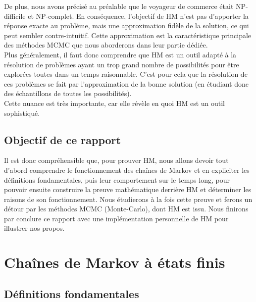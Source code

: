 \documentclass{article}
\begin{document}
De plus, nous avons précisé au préalable que le voyageur de commerce était NP-difficile et NP-complet. En conséquence, l'objectif de HM n'est pas d'apporter la réponse exacte au problème, mais une approximation fidèle de la solution, ce qui peut sembler contre-intuitif. Cette approximation est la caractéristique principale des méthodes MCMC que nous aborderons dans leur partie dédiée. \\
Plus généralement, il faut donc comprendre que HM est un outil adapté à la résolution de problèmes ayant un trop grand nombre de possibilités pour être explorées toutes dans un temps raisonnable. C'est pour cela que la résolution de ces problèmes se fait par l'approximation de la bonne solution (en étudiant donc des échantillons de toutes les possibilités). \\
Cette nuance est très importante, car elle révèle en quoi HM est un outil sophistiqué. \\ 

\subsection{Objectif de ce rapport}

Il est donc compréhensible que, pour prouver HM, nous allons devoir tout d'abord comprendre le fonctionnement des chaînes de Markov et en expliciter les définitions fondamentales, puis leur comportement sur le temps long, pour pouvoir ensuite construire la preuve mathématique derrière HM et déterminer les raisons de son fonctionnement. Nous étudierons à la fois cette preuve et ferons un détour par les méthodes MCMC (Monte-Carlo), dont HM est issu. Nous finirons par conclure ce rapport avec une implémentation personnelle de HM pour illustrer nos propos.



\newpage
\section{Chaînes de Markov à états finis}

\subsection{Définitions fondamentales}

\end{document}
